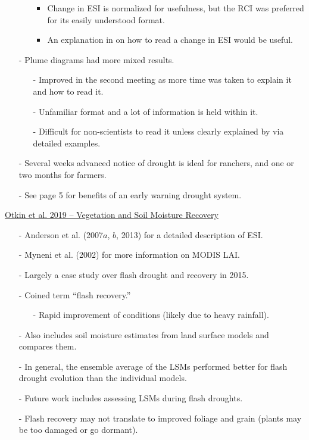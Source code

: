 \documentclass[12pt, letterpaper]{article}
\begin{document}
\begin{itemize}
\begin{itemize}
        	\begin{itemize}
        		\item Change in ESI is normalized for usefulness, but the RCI was preferred for its
        		      easily understood format.
        		\item An explanation in on how to read a change in ESI would be useful.
        	\end{itemize}
        \end{itemize}
        \item[-] Plume diagrams had more mixed results.
        \begin{itemize}
        	\item[-] Improved in the second meeting as more time was taken to explain it and how to read
        	         it.
        	\item[-] Unfamiliar format and a lot of information is held within it.
        	\item[-] Difficult for non-scientists to read it unless clearly explained by via detailed
        	         examples.
        \end{itemize}
        \item[-] Several weeks advanced notice of drought is ideal for ranchers, and one or two months
                 for farmers.
        \item[-] See page 5 for benefits of an early warning drought system.
    \end{itemize}

    \underline{Otkin et al. 2019 -- Vegetation and Soil Moisture Recovery}
    \begin{itemize}
    	\item[-] Anderson et al. (2007$a$, $b$, 2013) for a detailed description of ESI.
    	\item[-] Myneni et al. (2002) for more information on MODIS LAI.
    	\item[-] Largely a case study over flash drought and recovery in 2015.
    	\item[-] Coined term ``flash recovery.''
    	\begin{itemize}
    		\item[-] Rapid improvement of conditions (likely due to heavy rainfall).
    	\end{itemize}
        \item[-] Also includes soil moisture estimates from land surface models and compares them.
        \item[-] In general, the ensemble average of the LSMs performed better for flash drought 
                 evolution than the individual models. 
        \item[-] Future work includes assessing LSMs during flash droughts.
        \item[-] Flash recovery may not translate to improved foliage and grain (plants may be too
                 damaged or go dormant).
    \end{itemize}
\end{document}
